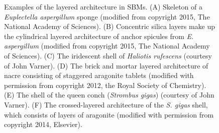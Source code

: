\documentclass[12pt,onecolumn]{article}
\begin{document}
\begin{bibunit}
\begin{figure}[ht!]
			\caption{Examples of the layered architecture in SBMs. (A) Skeleton of a \textit{Euplectella aspergillum} sponge (modified from \cite{monn2015new} copyright 2015, The National Academy of Sciences). (B) Concentric silica layers make up the cylindrical layered architecture of anchor spicules from \textit{E. aspergillum} (modified from \cite{monn2015new} copyright 2015, The National Academy of Sciences). (C) The iridescent shell of \textit{Haliotis rufescens} (courtesy of John Varner). (D) The brick and mortar layered architecture of nacre consisting of staggered aragonite tablets (modified with permission from \cite{rabiei2012nacre} copyright 2012, the Royal Society of Chemistry). (E) The shell of the queen conch (\textit{Strombus gigas}) (courtesy of John Varner). (F) The crossed-layered architecture of the \textit{S. gigas} shell, which consists of layers of aragonite (modified with permission from \cite{osuna2014shell} copyright 2014, Elsevier).}
			\label{fig:arch}
			\end{figure}


\end{bibunit}
\end{document}
